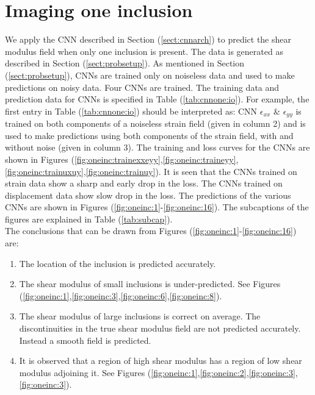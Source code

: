 \documentclass[12pt]{article}
\begin{document}
\section{Imaging one inclusion}
We apply the CNN described in Section (\ref{sect:cnnarch}) to predict the shear modulus field when only one inclusion is present. The data is generated as described in Section (\ref{sect:probsetup}). As mentioned in Section (\ref{sect:probsetup}), CNNs are trained only on noiseless data and used to make predictions on noisy data. Four CNNs are trained. The training data and prediction data for CNNs is specified in Table (\ref{tab:cnnone:io}). For example, the first entry in Table (\ref{tab:cnnone:io}) should be interpreted as: CNN $\epsilon_{xx}$ \& $\epsilon_{yy}$ is trained on both components of a noiseless strain field (given in column 2) and is used to make predictions using both components of the strain field, with and without noise (given in column 3). The training and loss curves for the CNNs are shown in Figures (\ref{fig:oneinc:trainexxeyy},\ref{fig:oneinc:traineyy},\ref{fig:oneinc:trainuxuy},\ref{fig:oneinc:trainuy}). It is seen that the CNNs trained on strain data show a sharp and early drop in the loss. The CNNs trained on displacement data show slow drop in the loss. The predictions of the various CNNs are shown in Figures (\ref{fig:oneinc:1}-\ref{fig:oneinc:16}). The subcaptions of the figures are explained in Table (\ref{tab:subcap}).\\
The conclusions that can be drawn from Figures (\ref{fig:oneinc:1}-\ref{fig:oneinc:16}) are:
\begin{enumerate}
\item{The location of the inclusion is predicted accurately.}
\item{The shear modulus of small inclusions is under-predicted. See Figures (\ref{fig:oneinc:1},\ref{fig:oneinc:3},\ref{fig:oneinc:6},\ref{fig:oneinc:8}).}
\item{The shear modulus of large inclusions is correct on average. The discontinuities in the true shear modulus field are not predicted accurately. Instead a smooth field is predicted.}
\item{It is observed that a region of high shear modulus has a region of low shear modulus adjoining it. See Figures (\ref{fig:oneinc:1},\ref{fig:oneinc:2},\ref{fig:oneinc:3},\ref{fig:oneinc:3}). }
\end{enumerate}
%
\end{document}
